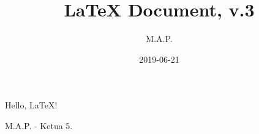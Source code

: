 \documentclass{article}
\title{LaTeX Document, v.3}
\date{2019-06-21}
\author{M.A.P.}
\begin{document}
  \maketitle
  \newpage

  Hello, \LaTeX!  
  
  M.A.P. - Ketua 5.
\end{document}
